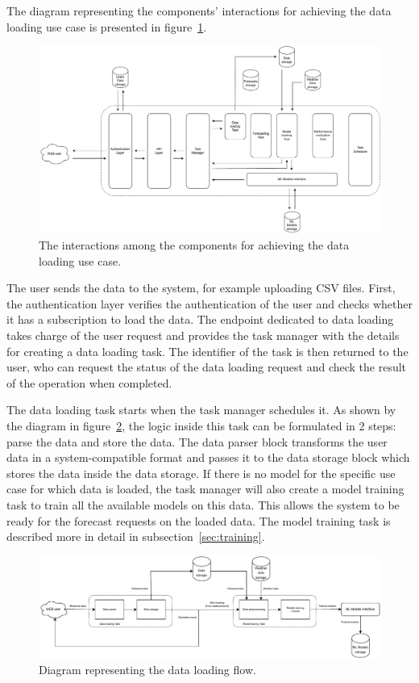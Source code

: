 The diagram representing the components' interactions for achieving the data loading use case is presented in figure~\ref{fig:loadinginteractions}.

\begin{figure}[H]
\centering
\includegraphics[width=1\textwidth]{images/architecture_data_loading_interactions}
\caption{The interactions among the components for achieving the data loading use case.}
\label{fig:loadinginteractions}
\end{figure}

The user sends the data to the system, for example uploading CSV files.
First, the authentication layer verifies the authentication of the user and checks whether it has a subscription to load the data.
The endpoint dedicated to data loading takes charge of the user request and provides the task manager with the details for creating a data loading task.
The identifier of the task is then returned to the user, who can request the status of the data loading request and check the result of the operation when completed.

The data loading task starts when the task manager schedules it.
As shown by the diagram in figure~\ref{fig:loadingflow}, the logic inside this task can be formulated in 2 steps: parse the data and store the data.
The data parser block transforms the user data in a system-compatible format and passes it to the data storage block which stores the data inside the data storage.
If there is no model for the specific use case for which data is loaded, the task manager will also create a model training task to train all the available models on this data.
This allows the system to be ready for the forecast requests on the loaded data.
The model training task is described more in detail in subsection~\ref{sec:training}.

\begin{figure}[H]
\centering
\includegraphics[width=1\textwidth]{images/architecture_data_loading_flow}
\caption{Diagram representing the data loading flow.}
\label{fig:loadingflow}
\end{figure}


